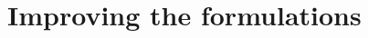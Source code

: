 \documentclass[utf8,aspectratio=1610,ngerman,english]{beamer}
\newcommand{\nPC}{\hyperref[eq:nPC]{\texttt{(nPC1)}}\xspace}
\newcommand{\nPCE}{\hyperref[eq:nPCE]{\texttt{(nPC3)}}\xspace}
\newcommand{\nPCY}{\hyperref[eq:nPCY]{\texttt{(nPC2)}}\xspace}
\newcommand{\pCP}{($p$CP)\xspace}
\begin{document}

\section{Improving the formulations}
\end{document}
